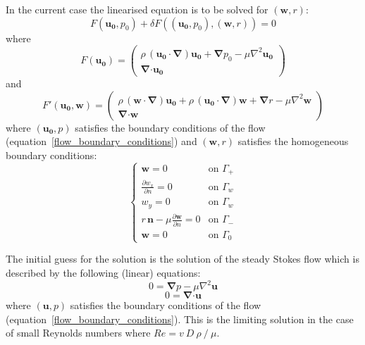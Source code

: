 \documentclass[12pt, a4paper]{article}
\begin{document}
        In the current case the linearised equation is to be solved for $(\mathbf{w}, r)$:
        \begin{equation}
            F(\mathbf{u_0}, p_0) + \delta F((\mathbf{u_0}, p_0), (\mathbf{w}, r)) = 0
        \end{equation}
        where
        \begin{equation}
            F(\mathbf{u_0}) =
            \begin{pmatrix}
            \rho \, (\mathbf{u_0 \cdot} \boldsymbol{\nabla}) \mathbf{u_0} + 
                \boldsymbol{\nabla} p_0 - 
                \mu \nabla^2 \mathbf{u_0} \\
            \boldsymbol{\nabla} \mathbf{\cdot u_0}
            \end{pmatrix}
        \end{equation}
        and
        \begin{equation}
            F'(\mathbf{u_0}, \mathbf{w}) = 
            \begin{pmatrix}
            \rho \, (\mathbf{w \cdot} \boldsymbol{\nabla}) \mathbf{u_0} + 
            \rho \, (\mathbf{u_0 \cdot} \boldsymbol{\nabla}) \mathbf{w} + 
            \boldsymbol{\nabla} r - 
            \mu \nabla^2 \mathbf{w} \\
            \boldsymbol{\nabla} \mathbf{\cdot w}
            \end{pmatrix}
        \end{equation}
        where $(\mathbf{u_0}, p)$ satisfies the boundary conditions of the flow (equation~\ref{flow_boundary_conditions}) and $(\mathbf{w}, r)$ satisfies the homogeneous boundary conditions:
        \begin{equation} \label{homogeneous_flow_boundary_conditions}
        \begin{cases}
        \mathbf{w} = 0 & \text{on } \Gamma_+ \\
        \frac{\partial w_x}{\partial n} = 0 & \text{on } \Gamma_w \\
        w_y = 0  & \text{on } \Gamma_w \\
        r \, \mathbf{n} - \mu \frac{\partial \mathbf{w}}{\partial n} = 0 & \text{on } \Gamma_- \\
        \mathbf{w} = 0 & \text{on } \Gamma_0
        \end{cases}
        \end{equation}
        
        The initial guess for the solution is the solution of the steady Stokes flow which is described by the following (linear) equations:
        \begin{equation} \label{Stokes_1}
        0 =\boldsymbol{\nabla} p - \mu \nabla^2 \mathbf{u}
        \end{equation}
        \begin{equation} \label{Stokes_2}
        0 = \boldsymbol{\nabla} \mathbf{\cdot u}
        \end{equation}
        where $(\mathbf{u}, p)$ satisfies the boundary conditions of the flow (equation~\ref{flow_boundary_conditions}). This is the limiting solution in the case of small Reynolds numbers where $Re = v~D~\rho~/~\mu$.
		
\end{document}

